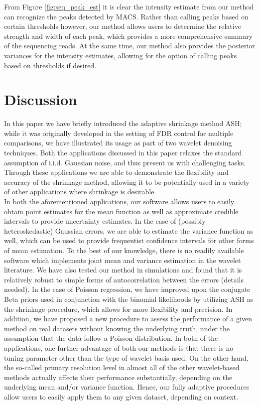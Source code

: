 \documentclass[12pt]{article}
\begin{document}
From Figure \ref{fig:seq_peak_est} it is clear the intensity estimate from our method can recognize the peaks detected by MACS. Rather than calling peaks based on certain thresholds however, our method allows users to determine the relative strength and width of each peak, which provides a more comprehensive summary of the sequencing reads. At the same time, our method also provides the posterior variances for the intensity estimates, allowing for the option of calling peaks based on thresholds if desired.\\
\section{Discussion}
In this paper we have briefly introduced the adaptive shrinkage method ASH; while it was originally developed in the setting of FDR control for multiple comparisons, we have illustrated its usage as part of two wavelet denoising techniques. Both the applications discussed in this paper relaxes the standard assumption of i.i.d. Gaussian noise, and thus present us with challenging tasks. Through these applications we are able to demonstrate the flexibility and accuracy of the shrinkage method, allowing it to be potentially used in a variety of other applications where shrinkage is desirable.\bigskip\\
In both the aforementioned applications, our software allows users to easily obtain point estimates for the mean function as well as approximate credible intervals to provide uncertainty estimates. In the case of (possibly heteroskedastic) Gaussian errors, we are able to estimate the variance function as well, which can be used to provide frequentist confidence intervals for other forms of mean estimation. To the best of our knowledge, there is no readily available software which implements joint mean and variance estimation in the wavelet literature. We have also tested our method in simulations and found that it is relatively robust to simple forms of autocorrelation between the errors (details needed). In the case of Poisson regression, we have improved upon the conjugate Beta priors used in conjunction with the binomial likelihoods by utilizing ASH as the shrinkage procedure, which allows for more flexibility and precision. In addition, we have proposed a new procedure to assess the performance of a given method on real datasets without knowing the underlying truth, under the assumption that the data follow a Poisson distribution. In both of the applications, one further advantage of both our methods is that there is no tuning parameter other than the type of wavelet basis used. On the other hand, the so-called primary resolution level in almost all of the other wavelet-based methods actually affects their performance substantially, depending on the underlying mean and/or variance function. Hence, our fully adaptive procedures allow users to easily apply them to any given dataset, depending on context.\bigskip\\
\end{document}
